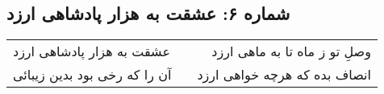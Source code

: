 \begin{center}
\section*{شماره ۶: عشقت به هزار پادشاهی ارزد}
\label{sec:006}
\begin{longtable}{l p{0.5cm} r}
عشقت به هزار پادشاهی ارزد
&&
وصلِ تو ز ماه تا به ماهی ارزد
\\
آن را که رخی بود بدین زیبائی
&&
انصاف بده که هرچه خواهی ارزد
\\
\end{longtable}
\end{center}
